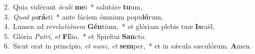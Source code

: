 {2.~}Quia vidérunt \textit{ó}\textit{cu}\textit{li} \textbf{me}i~* salutáre \textbf{tu}um,\\
{3.~}\textit{Quod} \textit{pa}\textbf{rá}sti~* ante fáciem ómnium popu\textbf{ló}rum,\\
{4.~}Lumen ad revela\textit{ti}\textit{ó}\textit{nem} \textbf{Gén}tium,~* et glóriam plebis tuæ \textbf{Is}raël.\\
{5.~}Glória \textit{Pa}\textit{tri}, \textit{et} \textbf{Fí}lio,~* et Spirítui \textbf{San}cto.\\
{6.~}Sicut erat in princípio, \textit{et} \textit{nunc}, \textit{et} \textbf{sem}per,~* et in sǽcula sæculórum. \textbf{A}men.\\
